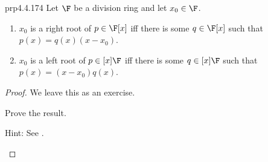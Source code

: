 \begin{prp}{}{prp4.4.174}
	Let $\F$ be a division ring and let $x_0\in \F$.
	\begin{enumerate}
		\item $x_0$ is a right root of $p\in \F[x]$ iff there is some $q\in \F [x]$ such that $p(x)=q(x)(x-x_0)$.
		\item $x_0$ is a left root of $p\in [x]\F$ iff there is some $q\in [x]\F$ such that $p(x)=(x-x_0)q(x)$.
	\end{enumerate}
	\begin{proof}
		We leave this as an exercise.
		\begin{exr}[breakable=false]{}{}
			Prove the result.
			\begin{rmk}
				Hint:  See \cite[Proposition 16.2]{Lam}.
			\end{rmk}
		\end{exr}
	\end{proof}
\end{prp}

